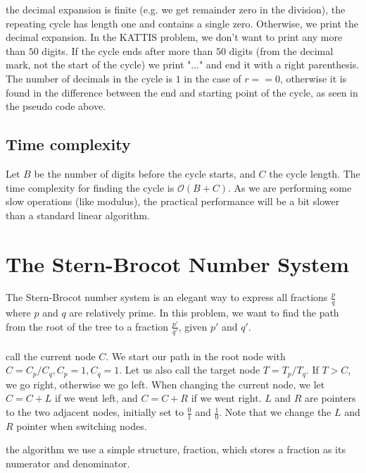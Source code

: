 \documentclass[11pt,a4paper,twoside]{article}
\begin{document}
       
 the decimal expansion is finite (e.g. we get remainder zero in the
division), the repeating cycle has length one and contains a single zero.
Otherwise, we print the decimal expansion. In the KATTIS problem, we don't want
to print any more than $50$ digits. If the cycle ends after more than $50$
digits (from the decimal mark, not the start of the cycle) we print "..." and
end it with a right parenthesis. The number of decimals in the cycle is $1$ in
the case of $r==0$, otherwise it is found in the difference between the end and
starting point of the cycle, as seen in the pseudo code above.

\subsection{Time complexity}
Let $B$ be the number of digits before the cycle starts, and $C$ the cycle length. The time 
complexity for finding the cycle is $\mathcal{O}(B+C)$. As we are performing some slow 
operations (like modulus), the practical performance will be a bit slower than a standard 
linear algorithm.

\section{The Stern-Brocot Number System}

The Stern-Brocot number system is an elegant way to express all fractions
$\frac{p}{q}$ where $p$ and $q$ are relatively prime. In this problem, we want
to find the path from the root of the tree to a fraction $\frac{p'}{q'}$, given
$p'$ and $q'$. 
\\\\
 call the current node $C$. We start our path in the root node
with $C = C_{p}/C_{q}, C_{p} = 1, C_{q} = 1$. Let us also call the target node
$T = T_{p}/T_{q}$. If $T > C$, we go right, otherwise we go left. When changing
the current node, we let $C = C + L$ if we went left, and $C = C + R$ if we
went right. $L$ and $R$ are pointers to the two adjacent nodes, initially set
to $\frac{0}{1}$ and $\frac{1}{0}$. Note that we change the $L$ and $R$ pointer
when switching nodes.


 the algorithm we use a simple structure, fraction, which stores a
fraction as its numerator and denominator.
\end{document}
